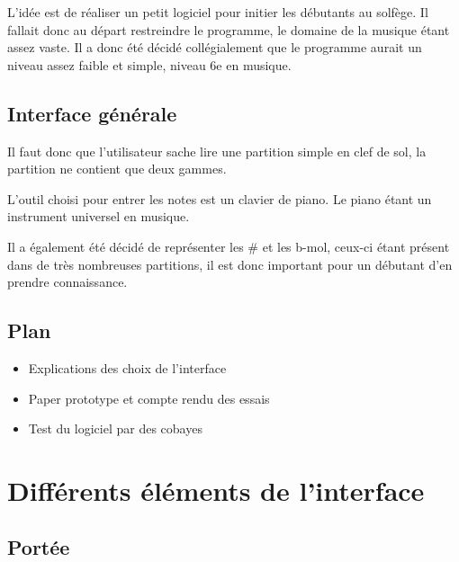 \documentclass{article}
\begin{document}
L'idée est de réaliser un petit logiciel pour initier les débutants au solfège. Il fallait donc au départ restreindre le programme,
le domaine de la musique étant assez vaste. Il a donc été décidé collégialement que le programme aurait un niveau assez faible et 
simple, niveau 6e en musique.


\subsection{Interface générale}

\vspace{1cm}

Il faut donc que l'utilisateur sache lire une partition simple en clef de sol, la partition ne contient que deux gammes.

L'outil choisi pour entrer les notes est un clavier de piano. Le piano étant un instrument universel en musique.

Il a également été décidé de représenter les \#
{ }et les b-mol, ceux-ci étant présent dans de très nombreuses partitions, il est donc
important pour un débutant d'en prendre connaissance.


\subsection{Plan}
\begin{itemize}
\item Explications des choix de l'interface
\item Paper prototype et compte rendu des essais
\item Test du logiciel par des cobayes
\end{itemize}

\newpage
\section{Différents éléments de l'interface}

\subsection{Portée}
\end{document}
